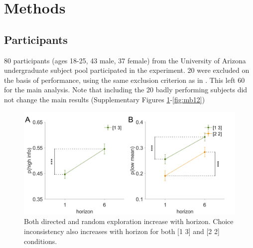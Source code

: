\documentclass[12pt]{article}
\begin{document}
	
	
	
	\section*{Methods}
	\subsection*{Participants}
	
	80 participants (ages 18-25, 43 male, 37 female) from the University of Arizona undergraduate subject pool participated in the experiment. 20 were excluded on the basis of performance, using the same exclusion criterion as in \citep{wilson2014}. This left 60 for the main analysis. Note that including the 20 badly performing subjects did not change the main results (Supplementary Figures \ref{fig:modelfree2}-\ref{fig:mb12})%
	
	\begin{figure}[H]
		\begin{center}
			\includegraphics[width=\textwidth]{figall/line_modelfree.png}
			\caption{Both directed and random exploration increase with horizon. Choice inconsistency also increases with horizon for both [1 3] and [2 2] conditions.}
			\label{fig:modelfree2}
		\end{center}
	\end{figure}
\end{document}
